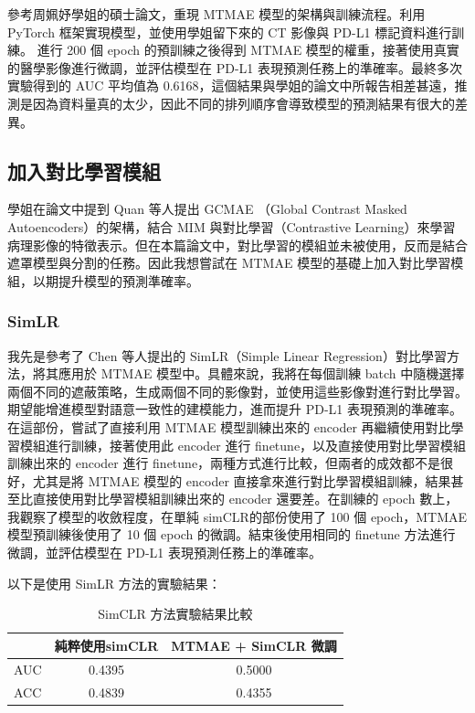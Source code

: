 \documentclass[12pt,a4paper]{article}
\begin{document}
參考周姵妤學姐的碩士論文，重現 MTMAE 模型的架構與訓練流程。利用 PyTorch 框架實現模型，並使用學姐留下來的 CT 影像與 PD-L1 標記資料進行訓練。
進行 200 個 epoch 的預訓練之後得到 MTMAE 模型的權重，接著使用真實的醫學影像進行微調，並評估模型在 PD-L1 表現預測任務上的準確率。最終多次實驗得到的 AUC 平均值為 0.6168，這個結果與學姐的論文中所報告相差甚遠，推測是因為資料量真的太少，因此不同的排列順序會導致模型的預測結果有很大的差異。


\subsection{加入對比學習模組}
學姐在論文中提到 Quan 等人提出 GCMAE （Global Contrast Masked Autoencoders）的架構，結合 MIM 與對比學習（Contrastive Learning）來學習病理影像的特徵表示。但在本篇論文中，對比學習的模組並未被使用，反而是結合遮罩模型與分割的任務。因此我想嘗試在 MTMAE 模型的基礎上加入對比學習模組，以期提升模型的預測準確率。

\subsubsection{SimLR}
我先是參考了 Chen 等人提出的 SimLR（Simple Linear Regression）對比學習方法，將其應用於 MTMAE 模型中。具體來說，我將在每個訓練 batch 中隨機選擇兩個不同的遮蔽策略，生成兩個不同的影像對，並使用這些影像對進行對比學習。期望能增進模型對語意一致性的建模能力，進而提升 PD-L1 表現預測的準確率。在這部份，嘗試了直接利用 MTMAE 模型訓練出來的 encoder 再繼續使用對比學習模組進行訓練，接著使用此 encoder 進行 finetune，以及直接使用對比學習模組訓練出來的 encoder 進行 finetune，兩種方式進行比較，但兩者的成效都不是很好，尤其是將 MTMAE 模型的 encoder 直接拿來進行對比學習模組訓練，結果甚至比直接使用對比學習模組訓練出來的 encoder 還要差。在訓練的 epoch 數上，我觀察了模型的收斂程度，在單純 simCLR的部份使用了 100 個 epoch，MTMAE 模型預訓練後使用了 10 個 epoch 的微調。結束後使用相同的 finetune 方法進行微調，並評估模型在 PD-L1 表現預測任務上的準確率。

以下是使用 SimLR 方法的實驗結果：

\begin{table}[h]
\centering
\begin{tabular}{lcc}
\toprule
 & \textbf{純粹使用simCLR} & \textbf{MTMAE + SimCLR 微調} \\
\midrule
AUC          & 0.4395 & 0.5000 \\
ACC          & 0.4839 & 0.4355 \\
\bottomrule
\end{tabular}
\caption{SimCLR 方法實驗結果比較}
\label{tab:simclr-results}
\end{table}
\end{document}
